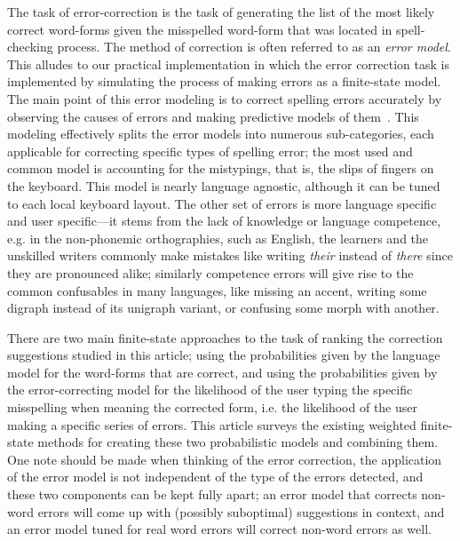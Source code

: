\documentclass[a4paper,12pt]{article}
\begin{document}
The task of error-correction is the task of generating the list of the most
likely correct word-forms given the misspelled word-form that was located in
spell-checking process. The method of correction is often referred to as an
\emph{error model}. This alludes to our practical implementation in which the
error correction task is implemented by simulating the process of making errors
as a finite-state model. The main point of this error modeling is to correct
spelling errors accurately by observing the causes of errors and making
predictive models of them~\cite[]{deorowicz2005correcting}.  This modeling
effectively splits the error models into numerous sub-categories, each
applicable for correcting specific types of spelling error; the most used and
common model is accounting for the mistypings, that is, the slips of fingers on
the keyboard. This model is nearly language agnostic, although it can be tuned
to each local keyboard layout. The other set of errors is more language
specific and user specific---it stems from the lack of knowledge or language
competence, e.g.  in the non-phonemic orthographies, such as English, the
learners and the unskilled writers commonly make mistakes like writing
\emph{their} instead of \emph{there} since they are pronounced alike; similarly
competence errors will give rise to the common confusables in many languages,
like missing an accent, writing some digraph instead of its unigraph variant,
or confusing some morph with another.

There are two main finite-state approaches to the task of ranking the
correction suggestions studied in this article; using the probabilities given
by the language model for the word-forms that are correct, and using the
probabilities given by the error-correcting model for the likelihood of the
user typing the specific misspelling when meaning the corrected form, i.e. the
likelihood of the user making a specific series of errors. This article surveys
the existing weighted finite-state methods for creating these two probabilistic
models and combining them. One note should be made when thinking of the error
correction, the application of the error model is not independent of the type
of the errors detected, and these two components can be kept fully apart; an
error model that corrects non-word errors will come up with (possibly
suboptimal) suggestions in context, and an error model tuned for real word
errors will correct non-word errors as well.
\end{document}
